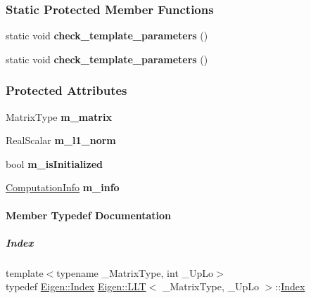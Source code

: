 \subsubsection*{Static Protected Member Functions}
\begin{DoxyCompactItemize}
\item 
\mbox{\label{group___cholesky___module_a661ba945968e0b91357f8cdf72db09f8}} 
static void {\bfseries check\+\_\+template\+\_\+parameters} ()
\item 
\mbox{\label{group___cholesky___module_a661ba945968e0b91357f8cdf72db09f8}} 
static void {\bfseries check\+\_\+template\+\_\+parameters} ()
\end{DoxyCompactItemize}
\subsubsection*{Protected Attributes}
\begin{DoxyCompactItemize}
\item 
\mbox{\label{group___cholesky___module_ab632f0e414857af3782efbdc8a71a986}} 
Matrix\+Type {\bfseries m\+\_\+matrix}
\item 
\mbox{\label{group___cholesky___module_a1e499b31d6f7c8411ec99602eef76ec8}} 
Real\+Scalar {\bfseries m\+\_\+l1\+\_\+norm}
\item 
\mbox{\label{group___cholesky___module_a9dff09bd7ff28372f9c7fd81972f1059}} 
bool {\bfseries m\+\_\+is\+Initialized}
\item 
\mbox{\label{group___cholesky___module_a40964f05dfde7eb3a964e9df50a905e5}} 
\hyperlink{group__enums_ga85fad7b87587764e5cf6b513a9e0ee5e}{Computation\+Info} {\bfseries m\+\_\+info}
\end{DoxyCompactItemize}


\paragraph{Member Typedef Documentation}
\mbox{\label{group___cholesky___module_ac7a64274814fa76e8b1e9e945546037f}} 
\subparagraph{\texorpdfstring{Index}{Index}\hspace{0.1cm}{\footnotesize\ttfamily [1/2]}}
{\footnotesize\ttfamily template$<$typename \+\_\+\+Matrix\+Type, int \+\_\+\+Up\+Lo$>$ \\
typedef \hyperlink{namespace_eigen_a62e77e0933482dafde8fe197d9a2cfde}{Eigen\+::\+Index} \hyperlink{group___cholesky___module_class_eigen_1_1_l_l_t}{Eigen\+::\+L\+LT}$<$ \+\_\+\+Matrix\+Type, \+\_\+\+Up\+Lo $>$\+::\hyperlink{group___cholesky___module_ac7a64274814fa76e8b1e9e945546037f}{Index}}

